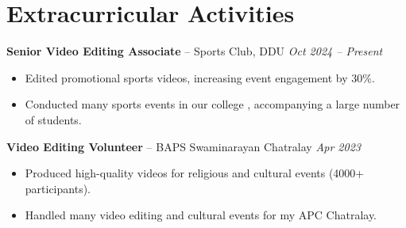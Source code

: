 \documentclass[10pt, letterpaper]{article}
\begin{document}
    \section*{Extracurricular Activities}
\textbf{Senior Video Editing Associate} – Sports Club, DDU \hfill \textit{Oct 2024 – Present}  
\begin{itemize}
    \item Edited promotional sports videos, increasing event engagement by 30\%.
    \item Conducted many sports events in our college , accompanying a large number of students. 
\end{itemize}

\textbf{Video Editing Volunteer} – BAPS Swaminarayan Chatralay \hfill \textit{Apr 2023}  
\begin{itemize}
    \item Produced high-quality videos for religious and cultural events (4000+ participants).
    \item Handled many video editing and cultural events for my APC Chatralay.
\end{itemize}
\end{document}
